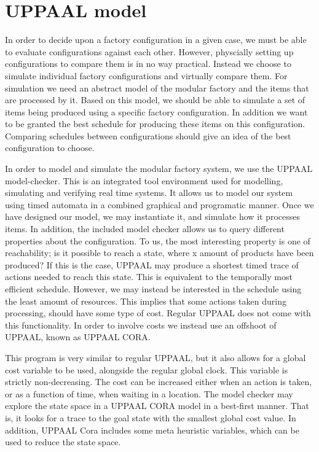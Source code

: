 \chapter{UPPAAL model}\label{ch:uppaalmodel}
In order to decide upon a factory configuration in a given case, we must be able to evaluate configurations against each other. However, physcially setting up configurations to compare them is in no way practical. Instead we choose to simulate individual factory configurations and virtually compare them. For simulation we need an abstract model of the modular factory and the items that are processed by it. Based on this model, we should be able to simulate a set of items being produced using a specific factory configuration. In addition we want to be granted the best schedule for producing these items on this configuration. Comparing schedules between configurations should give an idea of the best configuration to choose. 

In order to model and simulate the modular factory system, we use the UPPAAL model-checker\cite{Larsen97uppaalin}. This is an integrated tool environment used for modelling, simulating and verifying real time systems. It allows us to model our system using timed automata in a combined graphical and programatic manner. Once we have designed our model, we may instantiate it, and simulate how it processes items. In addition, the included model checker allows us to query different properties about the configuration. To us, the most interesting property is one of reachability; is it possible to reach a state, where x amount of products have been produced? If this is the case, UPPAAL may produce a shortest timed trace of actions needed to reach this state. This is equivalent to the temporally most efficient schedule. However, we may instead be interested in the schedule using the least amount of resources. This implies that some actions taken during processing, should have some type of cost. Regular UPPAAL does not come with this functionality. In order to involve costs we instead use an offshoot of UPPAAL, known as UPPAAL CORA\cite{UPPAALCORA}.

This program is very similar to regular UPPAAL, but it also allows for a global cost variable to be used, alongside the regular global clock. This variable is strictly non-decreasing. The cost can be increased either when an action is taken, or as a function of time, when waiting in a location. The model checker may explore the state space in a UPPAAL CORA model in a best-first manner. That is, it looks for a trace to the goal state with the smallest global cost value. In addition, UPPAAL Cora includes some meta heuristic variables, which can be used to reduce the state space.

